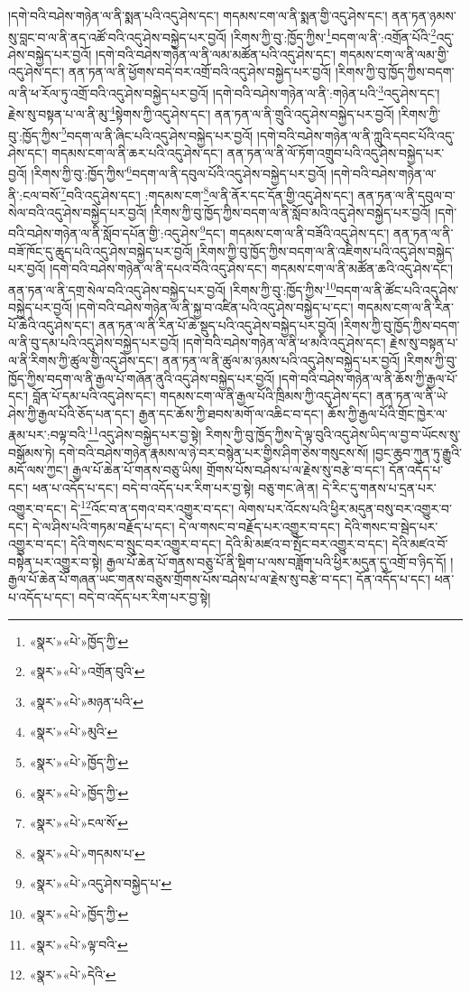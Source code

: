 །དགེ་བའི་བཤེས་གཉེན་ལ་ནི་སྨན་པའི་འདུ་ཤེས་དང་། གདམས་ངག་ལ་ནི་སྨན་གྱི་འདུ་ཤེས་དང་། ནན་ཏན་ཉམས་སུ་བླང་བ་ལ་ནི་ནད་འཚོ་བའི་འདུ་ཤེས་བསྐྱེད་པར་བྱའོ། །རིགས་ཀྱི་བུ་:ཁྱོད་ཀྱིས་\footnote{«སྣར་»«པེ་»ཁྱོད་ཀྱི་}བདག་ལ་ནི་:འགྲོན་པོའི་\footnote{«སྣར་»«པེ་»འགྲོན་བུའི་}འདུ་ཤེས་བསྐྱེད་པར་བྱའོ། །དགེ་བའི་བཤེས་གཉེན་ལ་ནི་ལམ་མཚོན་པའི་འདུ་ཤེས་དང་། གདམས་ངག་ལ་ནི་ལམ་གྱི་འདུ་ཤེས་དང་། ནན་ཏན་ལ་ནི་ཕྱོགས་བདེ་བར་འགྲོ་བའི་འདུ་ཤེས་བསྐྱེད་པར་བྱའོ། །རིགས་ཀྱི་བུ་ཁྱོད་ཀྱིས་བདག་ལ་ནི་ཕ་རོལ་ཏུ་འགྲོ་བའི་འདུ་ཤེས་བསྐྱེད་པར་བྱའོ། །དགེ་བའི་བཤེས་གཉེན་ལ་ནི་:གཉེན་པའི་\footnote{«སྣར་»«པེ་»མཉན་པའི་}འདུ་ཤེས་དང་། རྗེས་སུ་བསྟན་པ་ལ་ནི་མུ་\footnote{«སྣར་»«པེ་»མུའི་}སྟེགས་ཀྱི་འདུ་ཤེས་དང་། ནན་ཏན་ལ་ནི་གྲུའི་འདུ་ཤེས་བསྐྱེད་པར་བྱའོ། །རིགས་ཀྱི་བུ་:ཁྱོད་ཀྱིས་\footnote{«སྣར་»«པེ་»ཁྱོད་ཀྱི་}བདག་ལ་ནི་ཞིང་པའི་འདུ་ཤེས་བསྐྱེད་པར་བྱའོ། །དགེ་བའི་བཤེས་གཉེན་ལ་ནི་ཀླུའི་དབང་པོའི་འདུ་ཤེས་དང་། གདམས་ངག་ལ་ནི་ཆར་པའི་འདུ་ཤེས་དང་། ནན་ཏན་ལ་ནི་ལོ་ཏོག་འགྲུབ་པའི་འདུ་ཤེས་བསྐྱེད་པར་བྱའོ། །རིགས་ཀྱི་བུ་:ཁྱོད་ཀྱིས་\footnote{«སྣར་»«པེ་»ཁྱོད་ཀྱི་}བདག་ལ་ནི་དབུལ་པོའི་འདུ་ཤེས་བསྐྱེད་པར་བྱའོ། །དགེ་བའི་བཤེས་གཉེན་ལ་ནི་:ངལ་བསོ་\footnote{«སྣར་»«པེ་»ངལ་སོ་}བའི་འདུ་ཤེས་དང་། :གདམས་ངག་\footnote{«སྣར་»«པེ་»གདམས་པ་}ལ་ནི་ནོར་དང་དོན་གྱི་འདུ་ཤེས་དང་། ནན་ཏན་ལ་ནི་དབུལ་བ་སེལ་བའི་འདུ་ཤེས་བསྐྱེད་པར་བྱའོ། །རིགས་ཀྱི་བུ་ཁྱོད་ཀྱིས་བདག་ལ་ནི་སློབ་མའི་འདུ་ཤེས་བསྐྱེད་པར་བྱའོ། །དགེ་བའི་བཤེས་གཉེན་ལ་ནི་སློབ་དཔོན་གྱི་:འདུ་ཤེས་\footnote{«སྣར་»«པེ་»འདུ་ཤེས་བསྐྱེད་པ་}དང་། གདམས་ངག་ལ་ནི་བཟོའི་འདུ་ཤེས་དང་། ནན་ཏན་ལ་ནི་བཟོ་ཁོང་དུ་ཆུད་པའི་འདུ་ཤེས་བསྐྱེད་པར་བྱའོ། །རིགས་ཀྱི་བུ་ཁྱོད་ཀྱིས་བདག་ལ་ནི་འཇིགས་པའི་འདུ་ཤེས་བསྐྱེད་པར་བྱའོ། །དགེ་བའི་བཤེས་གཉེན་ལ་ནི་དཔའ་བོའི་འདུ་ཤེས་དང་། གདམས་ངག་ལ་ནི་མཚོན་ཆའི་འདུ་ཤེས་དང་། ནན་ཏན་ལ་ནི་དགྲ་སེལ་བའི་འདུ་ཤེས་བསྐྱེད་པར་བྱའོ། །རིགས་ཀྱི་བུ་:ཁྱོད་ཀྱིས་\footnote{«སྣར་»«པེ་»ཁྱོད་ཀྱི་}བདག་ལ་ནི་ཚོང་པའི་འདུ་ཤེས་བསྐྱེད་པར་བྱའོ། །དགེ་བའི་བཤེས་གཉེན་ལ་ནི་སྐྱ་བ་འཛིན་པའི་འདུ་ཤེས་བསྐྱེད་པ་དང་། གདམས་ངག་ལ་ནི་རིན་པོ་ཆེའི་འདུ་ཤེས་དང་། ནན་ཏན་ལ་ནི་རིན་པོ་ཆེ་སྡུད་པའི་འདུ་ཤེས་བསྐྱེད་པར་བྱའོ། །རིགས་ཀྱི་བུ་ཁྱོད་ཀྱིས་བདག་ལ་ནི་བུ་དམ་པའི་འདུ་ཤེས་བསྐྱེད་པར་བྱའོ། །དགེ་བའི་བཤེས་གཉེན་ལ་ནི་ཕ་མའི་འདུ་ཤེས་དང་། རྗེས་སུ་བསྟན་པ་ལ་ནི་རིགས་ཀྱི་ཚུལ་གྱི་འདུ་ཤེས་དང་། ནན་ཏན་ལ་ནི་ཚུལ་མ་ཉམས་པའི་འདུ་ཤེས་བསྐྱེད་པར་བྱའོ། །རིགས་ཀྱི་བུ་ཁྱོད་ཀྱིས་བདག་ལ་ནི་རྒྱལ་པོ་གཞོན་ནུའི་འདུ་ཤེས་བསྐྱེད་པར་བྱའོ། །དགེ་བའི་བཤེས་གཉེན་ལ་ནི་ཆོས་ཀྱི་རྒྱལ་པོ་དང་། བློན་པོ་དམ་པའི་འདུ་ཤེས་དང་། གདམས་ངག་ལ་ནི་རྒྱལ་པོའི་ཁྲིམས་ཀྱི་འདུ་ཤེས་དང་། ནན་ཏན་ལ་ནི་ཡེ་ཤེས་ཀྱི་རྒྱལ་པོའི་ཅོད་པན་དང་། རྒྱན་དང་ཆོས་ཀྱི་ཐབས་མགོ་ལ་འཆིང་བ་དང་། ཆོས་ཀྱི་རྒྱལ་པོའི་གྲོང་ཁྱེར་ལ་རྣམ་པར་:བལྟ་བའི་\footnote{«སྣར་»«པེ་»ལྟ་བའི་}འདུ་ཤེས་བསྐྱེད་པར་བྱ་སྟེ། རིགས་ཀྱི་བུ་ཁྱོད་ཀྱིས་དེ་ལྟ་བུའི་འདུ་ཤེས་ཡིད་ལ་བྱ་བ་ཡོངས་སུ་བསྒོམས་ཏེ། དགེ་བའི་བཤེས་གཉེན་རྣམས་ལ་ཉེ་བར་བསྙེན་པར་གྱིས་ཤིག་ཅེས་གསུངས་སོ། །བྱང་ཆུབ་ཀུན་ཏུ་རྒྱུའི་མདོ་ལས་ཀྱང་། རྒྱལ་པོ་ཆེན་པོ་གནས་བཅུ་ཡིས། གྲོགས་པོས་བཤེས་པ་ལ་རྗེས་སུ་བརྩེ་བ་དང་། དོན་འདོད་པ་དང་། ཕན་པ་འདོད་པ་དང་། བདེ་བ་འདོད་པར་རིག་པར་བྱ་སྟེ། བཅུ་གང་ཞེ་ན། དེ་རིང་དུ་གནས་པ་དྲན་པར་འགྱུར་བ་དང་། དེ་\footnote{«སྣར་»«པེ་»དེའི་}འོང་བ་ན་དགའ་བར་འགྱུར་བ་དང་། ལེགས་པར་འོངས་པའི་ཕྱིར་མདུན་བསུ་བར་འགྱུར་བ་དང་། དེ་ལ་ཤིས་པའི་གཏམ་བརྗོད་པ་དང་། དེ་ལ་གསང་བ་བརྗོད་པར་འགྱུར་བ་དང་། དེའི་གསང་བ་སྦེད་པར་འགྱུར་བ་དང་། དེའི་གསང་བ་སྲུང་བར་འགྱུར་བ་དང་། དེའི་མི་མཛའ་བ་སྤོང་བར་འགྱུར་བ་དང་། དེའི་མཛའ་བོ་བསྟེན་པར་འགྱུར་བ་སྟེ། རྒྱལ་པོ་ཆེན་པོ་གནས་བཅུ་པོ་ནི་སྡིག་པ་ལས་བཟློག་པའི་ཕྱིར་མདུན་དུ་འགྲོ་བ་ཉིད་དོ། །རྒྱལ་པོ་ཆེན་པོ་གཞན་ཡང་གནས་བཅུས་གྲོགས་པོས་བཤེས་པ་ལ་རྗེས་སུ་བརྩེ་བ་དང་། དོན་འདོད་པ་དང་། ཕན་པ་འདོད་པ་དང་། བདེ་བ་འདོད་པར་རིག་པར་བྱ་སྟེ། 